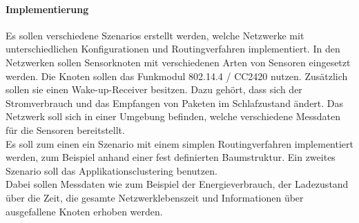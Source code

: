 \paragraph{Implementierung}
Es sollen verschiedene Szenarios erstellt werden, welche Netzwerke mit unterschiedlichen Konfigurationen und Routingverfahren implementiert. In den Netzwerken sollen Sensorknoten mit verschiedenen Arten von Sensoren eingesetzt werden. Die Knoten sollen das Funkmodul 802.14.4 / CC2420 nutzen. Zusätzlich sollen sie einen Wake-up-Receiver besitzen. Dazu gehört, dass sich der Stromverbrauch und das Empfangen von Paketen im Schlafzustand ändert. Das Netzwerk soll sich in einer Umgebung befinden, welche verschiedene Messdaten für die Sensoren bereitstellt.\\
Es soll zum einen ein Szenario mit einem simplen Routingverfahren implementiert werden, zum Beispiel anhand einer fest definierten Baumstruktur. Ein zweites Szenario soll das Applikationsclustering\cite{applc} benutzen.\\
Dabei sollen Messdaten wie zum Beispiel der Energieverbrauch, der Ladezustand über die Zeit, die gesamte Netzwerklebenszeit und Informationen über ausgefallene Knoten erhoben werden.